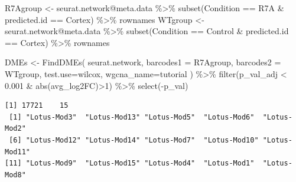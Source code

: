 \documentclass[
  letterpaper,
  DIV=11,
  numbers=noendperiod]{scrartcl}
\newenvironment{Shaded}{\begin{snugshade}}{\end{snugshade}}
\newcommand{\AttributeTok}[1]{\textcolor[rgb]{0.49,0.56,0.16}{#1}}
\newcommand{\DecValTok}[1]{\textcolor[rgb]{0.25,0.63,0.44}{#1}}
\newcommand{\FloatTok}[1]{\textcolor[rgb]{0.25,0.63,0.44}{#1}}
\newcommand{\FunctionTok}[1]{\textcolor[rgb]{0.02,0.16,0.49}{#1}}
\newcommand{\NormalTok}[1]{\textcolor[rgb]{0.00,0.44,0.13}{#1}}
\newcommand{\OtherTok}[1]{\textcolor[rgb]{0.00,0.44,0.13}{#1}}
\newcommand{\SpecialCharTok}[1]{\textcolor[rgb]{0.25,0.44,0.63}{#1}}
\newcommand{\StringTok}[1]{\textcolor[rgb]{0.25,0.44,0.63}{#1}}
\begin{document}
\begin{Shaded}
\begin{Highlighting}[]
\NormalTok{R7Agroup }\OtherTok{\textless{}{-}}\NormalTok{ seurat.network}\SpecialCharTok{@}\NormalTok{meta.data }\SpecialCharTok{\%\textgreater{}\%} \FunctionTok{subset}\NormalTok{(Condition }\SpecialCharTok{==} \StringTok{\textquotesingle{}R7A\textquotesingle{}} \SpecialCharTok{\&}\NormalTok{ predicted.id }\SpecialCharTok{==} \StringTok{\textquotesingle{}Cortex\textquotesingle{}}\NormalTok{) }\SpecialCharTok{\%\textgreater{}\%}\NormalTok{ rownames}
\NormalTok{WTgroup }\OtherTok{\textless{}{-}}\NormalTok{ seurat.network}\SpecialCharTok{@}\NormalTok{meta.data }\SpecialCharTok{\%\textgreater{}\%} \FunctionTok{subset}\NormalTok{(Condition }\SpecialCharTok{==} \StringTok{\textquotesingle{}Control\textquotesingle{}} \SpecialCharTok{\&}\NormalTok{ predicted.id }\SpecialCharTok{==} \StringTok{\textquotesingle{}Cortex\textquotesingle{}}\NormalTok{) }\SpecialCharTok{\%\textgreater{}\%}\NormalTok{ rownames}
\end{Highlighting}
\end{Shaded}

\begin{Shaded}
\begin{Highlighting}[]
\NormalTok{DMEs }\OtherTok{\textless{}{-}} \FunctionTok{FindDMEs}\NormalTok{(}
\NormalTok{  seurat.network,}
  \AttributeTok{barcodes1 =}\NormalTok{ R7Agroup,}
  \AttributeTok{barcodes2 =}\NormalTok{ WTgroup,}
  \AttributeTok{test.use=}\StringTok{\textquotesingle{}wilcox\textquotesingle{}}\NormalTok{,}
  \AttributeTok{wgcna\_name=}\StringTok{\textquotesingle{}tutorial\textquotesingle{}}
\NormalTok{) }\SpecialCharTok{\%\textgreater{}\%} \FunctionTok{filter}\NormalTok{(p\_val\_adj }\SpecialCharTok{\textless{}} \FloatTok{0.001} \SpecialCharTok{\&} \FunctionTok{abs}\NormalTok{(avg\_log2FC)}\SpecialCharTok{\textgreater{}}\DecValTok{1}\NormalTok{) }\SpecialCharTok{\%\textgreater{}\%} \FunctionTok{select}\NormalTok{(}\SpecialCharTok{{-}}\NormalTok{p\_val)}
\end{Highlighting}
\end{Shaded}

\begin{verbatim}
[1] 17721    15
 [1] "Lotus-Mod3"  "Lotus-Mod13" "Lotus-Mod5"  "Lotus-Mod6"  "Lotus-Mod2" 
 [6] "Lotus-Mod12" "Lotus-Mod14" "Lotus-Mod7"  "Lotus-Mod10" "Lotus-Mod11"
[11] "Lotus-Mod9"  "Lotus-Mod15" "Lotus-Mod4"  "Lotus-Mod1"  "Lotus-Mod8" 
\end{verbatim}
\end{document}

